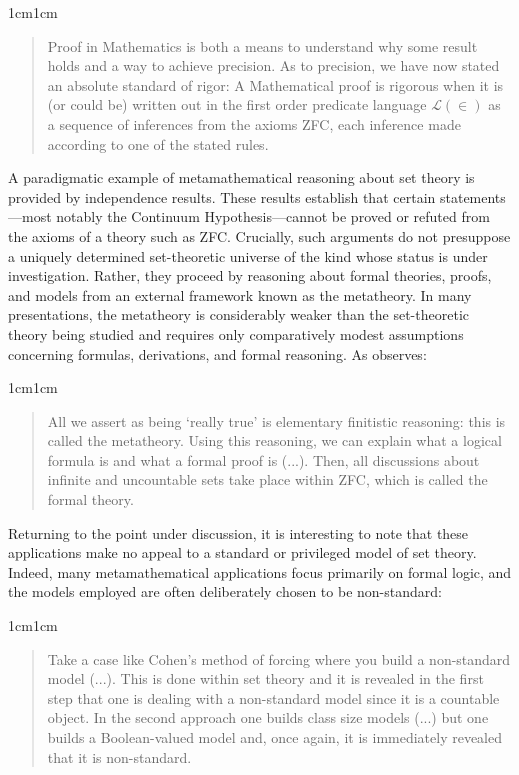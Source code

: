 \documentclass[11pt,a4paper]{article}
\begin{document}
\begin{adjustwidth}{1cm}{1cm}
\small
\begin{quote}
Proof in Mathematics is both a means to understand why some result holds and a way to achieve precision. As to precision, we have now stated an absolute standard of rigor: A Mathematical proof is rigorous when it is (or could be) written out in the first order predicate language $\mathcal{L}(\in)$ as a sequence of inferences from the axioms ZFC, each inference made according to one of the stated rules.
\end{quote}
\end{adjustwidth}

A paradigmatic example of metamathematical reasoning about set theory is provided by independence results. These results establish that certain statements—most notably the Continuum Hypothesis—cannot be proved or refuted from the axioms of a theory such as ZFC. Crucially, such arguments do not presuppose a uniquely determined set-theoretic universe of the kind whose status is under investigation. Rather, they proceed by reasoning about formal theories, proofs, and models from an external framework known as the metatheory. In many presentations, the metatheory is considerably weaker than the set-theoretic theory being studied and requires only comparatively modest assumptions concerning formulas, derivations, and formal reasoning. As \textcite[11]{Kunen2011} observes: 

\begin{adjustwidth}{1cm}{1cm}
\begin{quote}
  \small
All we assert as being ‘really true’ is elementary finitistic reasoning: this is called the metatheory. Using this reasoning, we can explain what a logical formula is and what a formal proof is (...). Then, all discussions about infinite and uncountable sets take place within ZFC, which is called the formal theory.
\end{quote}
\end{adjustwidth}

Returning to the point under discussion, it is interesting to note that these applications make no appeal to a standard or privileged model of set theory. Indeed, many metamathematical applications focus primarily on formal logic, and the models employed are often deliberately chosen to be non-standard:

\begin{adjustwidth}{1cm}{1cm}
\begin{quote}
\small
Take a case like Cohen's method of forcing where you build a non-standard model (...). This is done within set theory and it is revealed in the first step that one is dealing with a non-standard model since it is a countable object. In the second approach one builds class size models (...) but one builds a Boolean-valued model and, once again, it is immediately revealed that it is non-standard. \parencite[p. 16]{Koellner2022}
\end{quote}
\end{adjustwidth}
\end{document}
